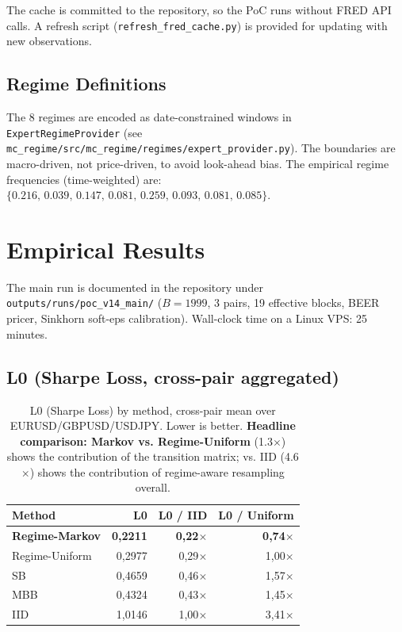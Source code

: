 \documentclass[11pt,a4paper]{article}
\theoremstyle{definition}
\begin{document}
The cache is committed to the repository, so the PoC runs without FRED API calls. A refresh script (\texttt{refresh\_fred\_cache.py}) is provided for updating with new observations.

\subsection{Regime Definitions}

The 8 regimes are encoded as date-constrained windows in \texttt{ExpertRegimeProvider} (see \texttt{mc\_regime/src/mc\_regime/regimes/expert\_provider.py}). The boundaries are macro-driven, not price-driven, to avoid look-ahead bias. The empirical regime frequencies (time-weighted) are: $\{0.216,\, 0.039,\, 0.147,\, 0.081,\, 0.259,\, 0.093,\, 0.081,\, 0.085\}$.

\section{Empirical Results}
\label{sec:results}

The main run is documented in the repository under \texttt{outputs/runs/poc\_v14\_main/} ($B = 1999$, 3 pairs, 19 effective blocks, BEER pricer, Sinkhorn soft-eps calibration). Wall-clock time on a Linux VPS: 25 minutes.

\subsection{L0 (Sharpe Loss, cross-pair aggregated)}

\begin{table}[h]
\centering
\caption{L0 (Sharpe Loss) by method, cross-pair mean over EURUSD/GBPUSD/USDJPY. Lower is better. \textbf{Headline comparison: Markov vs. Regime-Uniform} (1.3$\times$) shows the contribution of the transition matrix; vs. IID (4.6$\times$) shows the contribution of regime-aware resampling overall.}
\begin{tabular}{lrrr}
\toprule
Method & L0 & L0 / IID & L0 / Uniform \\
\midrule
\textbf{Regime-Markov}  & \textbf{0,2211} & \textbf{0,22$\times$} & \textbf{0,74$\times$} \\
Regime-Uniform         & 0,2977          & 0,29$\times$            & 1,00$\times$ \\
SB                     & 0,4659          & 0,46$\times$            & 1,57$\times$ \\
MBB                    & 0,4324          & 0,43$\times$            & 1,45$\times$ \\
IID                    & 1,0146          & 1,00$\times$            & 3,41$\times$ \\
\bottomrule
\end{tabular}
\end{table}
\end{document}
